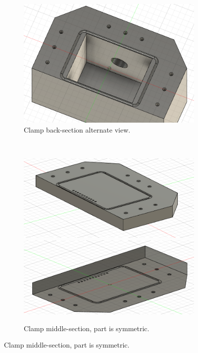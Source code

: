 \begin{figure}
\begin{subfigure}[t]{0.3\textwidth}
        \includegraphics[width=\textwidth]{Main/Ch4/3D_models/clamp-bottom-top-2.png}
        \caption{Clamp back-section alternate view.}
    \end{subfigure}
    ~
    \begin{subfigure}[t]{0.3\textwidth}
        \includegraphics[width=\textwidth]{Main/Ch4/3D_models/clamp-middle-top.png}
        \includegraphics[width=\textwidth]{Main/Ch4/3D_models/clamp-middle-bottom.png}
        \caption{Clamp middle-section, part is symmetric.}
    \end{subfigure}

\end{figure}
